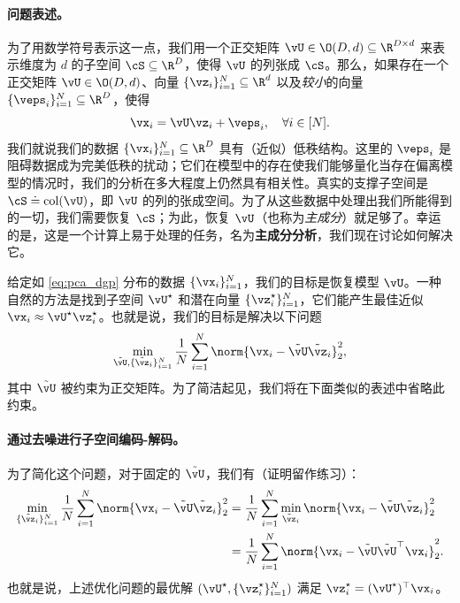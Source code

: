 \documentclass[../../book-main_zh.tex]{subfiles}
\begin{document}
\paragraph{问题表述。}
为了用数学符号表示这一点，我们用一个正交矩阵 \(\vU \in \O(D, d) \subseteq \R^{D \times d}\)
来表示维度为 \(d\) 的子空间 \(\cS \subseteq \R^{D}\)，使得 \(\vU\) 的列张成
\(\cS\)。那么，如果存在一个正交矩阵 \(\vU \in \O(D, d)\)、向量 \(\{\vz_{i}\}_{i =
1}^{N} \subseteq \R^{d}\) 以及\textit{较小}的向量 \(\{\veps_{i}\}_{i =
1}^{N} \subseteq \R^{D}\)，使得
\begin{equation}\label{eq:pca_dgp}
    \vx_{i} = \vU\vz_{i} + \veps_{i}, \quad \forall i \in [N].
\end{equation}
我们就说我们的数据 \(\{\vx_{i}\}_{i = 1}^{N} \subseteq \R^{D}\) 具有（近似）低秩结构。这里的
\(\veps_{i}\)
是阻碍数据成为完美低秩的扰动；它们在模型中的存在使我们能够量化当存在偏离模型的情况时，我们的分析在多大程度上仍然具有相关性。真实的支撑子空间是
\(\cS \doteq
\mathop{\mathrm{col}}(\vU)\)，即 $\vU$
的列的张成空间。为了从这些数据中处理出我们所能得到的一切，我们需要恢复 \(\cS\)；为此，恢复
\(\vU\)（也称为\textit{主成分}）就足够了。幸运的是，这是一个计算上易于处理的任务，名为{\bf 主成分分析}，我们现在讨论如何解决它。

给定如 \eqref{eq:pca_dgp} 分布的数据 \(\{\vx_{i}\}_{i = 1}^{N}\)，我们的目标是恢复模型
\(\vU\)。一种自然的方法是找到子空间 \(\vU^{\star}\) 和潜在向量 \(\{\vz_{i}^{\star}\}_{i
= 1}^{N}\)，它们能产生最佳近似 \(\vx_{i} \approx
\vU^{\star}\vz_{i}^{\star}\)。也就是说，我们的目标是解决以下问题
\begin{equation}\label{eq:pca_sparse_recovery_problem}
    \min_{\tilde{\vU}, \{\tilde{\vz}_{i}\}_{i =
    1}^{N}}\frac{1}{N}\sum_{i = 1}^{N}\norm{\vx_{i} -
    \tilde{\vU}\tilde{\vz}_{i}}_{2}^{2},
\end{equation}
其中 $\tilde{\vU}$ 被约束为正交矩阵。为了简洁起见，我们将在下面类似的表述中省略此约束。

\paragraph{通过去噪进行子空间编码-解码。}
为了简化这个问题，对于固定的 \(\tilde{\vU}\)，我们有（证明留作练习）：
\begin{align}
    \min_{\{\tilde{\vz}_{i}\}_{i = 1}^{N}}\frac{1}{N}\sum_{i =
    1}^{N}\norm{\vx_{i} - \tilde{\vU}\tilde{\vz}_{i}}_{2}^{2}
    &= \frac{1}{N}\sum_{i = 1}^{N}\min_{\tilde{\vz}_{i}}\norm{\vx_{i}
    - \tilde{\vU}\tilde{\vz}_{i}}_{2}^{2} \\
    &= \frac{1}{N}\sum_{i = 1}^{N}\norm{\vx_{i} -
    \tilde{\vU}\tilde{\vU}^{\top}\vx_{i}}_{2}^{2}.
\end{align}
也就是说，上述优化问题的最优解 \((\vU^{\star}, \{\vz_{i}^{\star}\}_{i = 1}^{N})\) 满足
$\vz_i^{\star} = (\vU^{\star})^\top\vx_i$。
\end{document}
